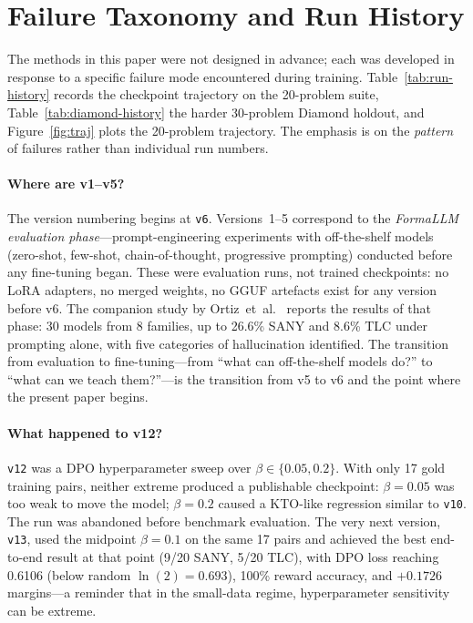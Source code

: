 \documentclass[11pt]{article}
\begin{document}
\section{Failure Taxonomy and Run History}
\label{sec:runs}

The methods in this paper were not designed in advance; each was
developed in response to a specific failure mode encountered during
training.  Table~\ref{tab:run-history} records the checkpoint
trajectory on the 20-problem suite, Table~\ref{tab:diamond-history}
the harder 30-problem Diamond holdout, and Figure~\ref{fig:traj}
plots the 20-problem trajectory.  The emphasis is on the
\emph{pattern} of failures rather than individual run numbers.

\paragraph{Where are v1--v5?}  The version numbering begins at
\texttt{v6}.  Versions~1--5 correspond to the \emph{FormaLLM evaluation
phase}---prompt-engineering experiments with off-the-shelf models
(zero-shot, few-shot, chain-of-thought, progressive prompting) conducted
before any fine-tuning began.  These were evaluation runs, not trained
checkpoints: no LoRA adapters, no merged weights, no GGUF artefacts
exist for any version before v6.  The companion study by
Ortiz~et~al.~\cite{ortiz2026formallm} reports the results of that
phase: 30 models from 8 families, up to 26.6\% SANY and 8.6\% TLC under
prompting alone, with five categories of hallucination identified.  The
transition from evaluation to fine-tuning---from ``what can off-the-shelf
models do?'' to ``what can we teach them?''---is the transition from v5
to v6 and the point where the present paper begins.

\paragraph{What happened to v12?}  \texttt{v12} was a DPO
hyperparameter sweep over $\beta \in \{0.05, 0.2\}$.  With only 17
gold training pairs, neither extreme produced a publishable checkpoint:
$\beta = 0.05$ was too weak to move the model; $\beta = 0.2$ caused a
KTO-like regression similar to \texttt{v10}.  The run was abandoned
before benchmark evaluation.  The very next version, \texttt{v13}, used
the midpoint $\beta = 0.1$ on the same 17 pairs and achieved the best
end-to-end result at that point (9/20 SANY, 5/20 TLC), with DPO loss
reaching 0.6106 (below random $\ln(2) = 0.693$), 100\% reward accuracy,
and $+0.1726$ margins---a reminder that in the small-data regime,
hyperparameter sensitivity can be extreme.
\end{document}
